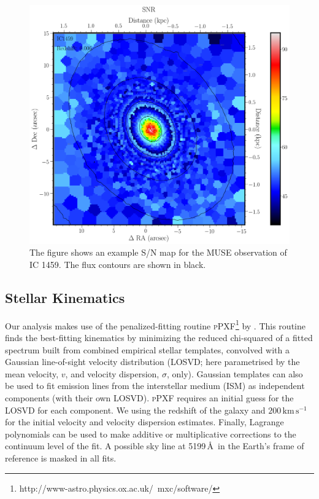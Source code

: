 		\begin{figure}
			\centering
			\includegraphics[width=.6\textwidth]{chapter2/egSNR.png}
			\caption[Example S/N map]{The figure shows an example S/N map for the MUSE observation of IC 1459. The flux contours are shown in black.}
			\label{fig:MassRe}
		\end{figure}

	\subsection{Stellar Kinematics}
		\label{subsec:StellarFit}
		Our analysis makes use of the penalized-fitting routine \textsc{pPXF}\footnote{http://www-astro.physics.ox.ac.uk/~mxc/software/} by \citet{Cappellari2004, Cappellari2016a}. This routine finds the best-fitting kinematics by minimizing the reduced chi-squared of a fitted spectrum built from combined empirical stellar templates, convolved with a Gaussian line-of-sight velocity distribution (LOSVD; here parametrised by the mean velocity, $v$, and velocity dispersion, $\sigma$, only). Gaussian templates can also be used to fit emission lines from the interstellar medium (ISM) as independent components (with their own LOSVD). \textsc{pPXF} requires an initial guess for the LOSVD for each component. We using the redshift of the galaxy and $200\,\mathrm{km\,s^{-1}}$ for the initial velocity and velocity dispersion estimates. Finally, Lagrange polynomials can be used to make additive or multiplicative corrections to the continuum level of the fit. A possible sky line at 5199\,\AA\ in the Earth's frame of reference is masked in all fits.

